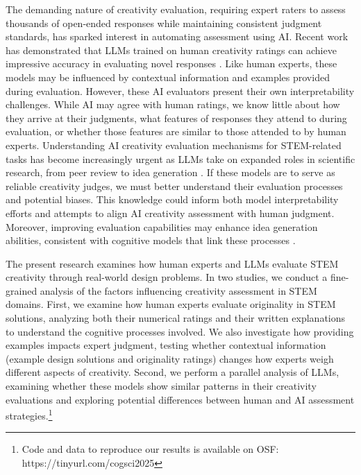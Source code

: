 The demanding nature of creativity evaluation, requiring expert raters to assess thousands of open-ended responses while maintaining consistent judgment standards, has sparked interest in automating assessment using AI. Recent work has demonstrated that LLMs trained on human creativity ratings can achieve impressive accuracy in evaluating novel responses \citep{organisciak2023beyond,Patterson2025}. Like human experts, these models may be influenced by contextual information and examples provided during evaluation. However, these AI evaluators present their own interpretability challenges. While AI may agree with human ratings, we know little about how they arrive at their judgments, what features of responses they attend to during evaluation, or whether those features are similar to those attended to by human experts. Understanding AI creativity evaluation mechanisms for STEM-related tasks has become increasingly urgent as LLMs take on expanded roles in scientific research, from peer review \citep{huang2025large,lin2024evaluating} to idea generation \citep{gu2024interesting,si2024can}. If these models are to serve as reliable creativity judges, we must better understand their evaluation processes and potential biases. This knowledge could inform both model interpretability efforts and attempts to align AI creativity assessment with human judgment. Moreover, improving evaluation capabilities may enhance idea generation abilities, consistent with cognitive models that link these processes \citep{smith1995creative}. 


The present research examines how human experts and LLMs evaluate STEM creativity through real-world design problems. In two studies, we conduct a fine-grained analysis of the factors influencing creativity assessment in STEM domains. First, we examine how human experts evaluate originality in STEM solutions, analyzing both their numerical ratings and their written explanations to understand the cognitive processes involved. We also investigate how providing examples impacts expert judgment, testing whether contextual information (example design solutions and originality ratings) changes how experts weigh different aspects of creativity. Second, we perform a parallel analysis of LLMs, examining whether these models show similar patterns in their creativity evaluations and exploring potential differences between human and AI assessment strategies.\footnote{Code and data to reproduce our results is available on OSF: https://tinyurl.com/cogsci2025}

